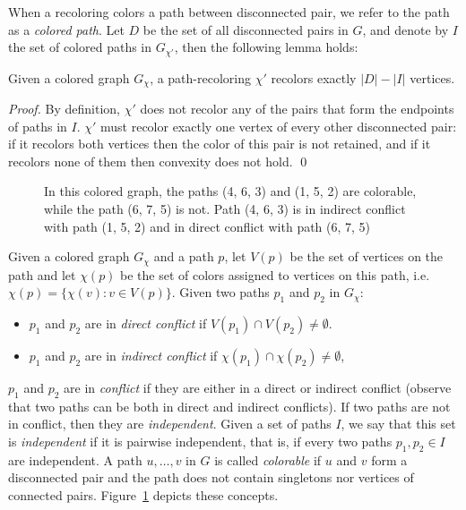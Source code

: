 When a recoloring colors a path between disconnected pair, 
we refer to the path as a \emph{colored path}.
%
Let $D$ be the set of all disconnected pairs in $G$, 
and denote by $I$ the set of colored paths in $G_{\chi'}$, 
then the following lemma holds:

\begin{lemma}
\label{lm:cost}
Given a colored graph $G_\chi$, 
a path-recoloring $\chi'$ recolors exactly $|D| - |I|$ vertices.
\end{lemma}

\begin{proof}
By definition,
$\chi'$ does not recolor any of the pairs that form the endpoints of paths in $I$.
%
$\chi'$ must recolor exactly one vertex of every other disconnected pair:
if it recolors both vertices then the color of this pair is not retained,
and if it recolors none of them then convexity does not hold.
\qed{}\end{proof}

\begin{figure}
\centering

\caption{
\label{fig:paths}
In this colored graph, the paths (4, 6, 3) and (1, 5, 2) are colorable, while
the path (6, 7, 5) is not.
Path (4, 6, 3) is in indirect conflict with path (1, 5, 2) and in direct
conflict with path (6, 7, 5)
}
\end{figure}
Given a colored graph $G_\chi$ and a path $p$, 
let $V(p)$ be the set of vertices on the path and let $\chi(p)$ 
be the set of colors assigned to vertices on this path, 
i.e. $\chi(p) = {\{\chi(v) : v \in V(p)\}}$.
%
Given two paths $p_1$ and $p_2$ in $G_\chi$:
\begin{itemize}
\item 
$p_1$ and $p_2$ are in \emph{direct conflict} if $V(p_1) \cap V(p_2) \neq \emptyset$.

\item 
$p_1$ and $p_2$ are in \emph{indirect conflict} if $\chi(p_1) \cap \chi(p_2) \neq \emptyset$,
\end{itemize}
%
$p_1$ and $p_2$ are in \emph{conflict} if they are either in a direct
or indirect conflict (observe that two paths can be both in direct and
indirect conflicts).
%
If two paths are not in conflict, 
then they are \emph{independent}.
%
Given a set of paths $I$, 
we say that this set is \emph{independent}
if it is pairwise independent, 
that is, 
if every two paths $p_1, p_2 \in I$ are independent.
%
A path $u, \dots, v$ in $G$ is called \emph{colorable} if $u$ and $v$
form a disconnected pair and the path does not contain singletons nor
vertices of connected pairs.
%
Figure~\ref{fig:paths} depicts these concepts.

